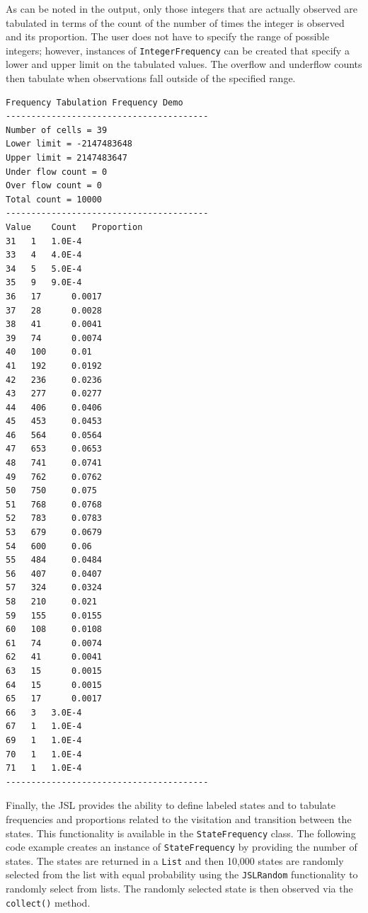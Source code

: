 \documentclass[
]{book}
\theoremstyle{definition}
\theoremstyle{definition}
\theoremstyle{definition}
\theoremstyle{definition}
\theoremstyle{remark}
\begin{document}
As can be noted in the output, only those integers that are actually observed are tabulated in terms of the count of the number of times the integer is observed and its proportion. The user does not have to specify the range of possible integers; however, instances of \texttt{IntegerFrequency} can be created that specify a lower and upper limit on the tabulated values. The overflow and underflow counts then tabulate when observations fall outside of the specified range.

\begin{verbatim}
Frequency Tabulation Frequency Demo
----------------------------------------
Number of cells = 39
Lower limit = -2147483648
Upper limit = 2147483647
Under flow count = 0
Over flow count = 0
Total count = 10000
----------------------------------------
Value    Count   Proportion
31   1   1.0E-4
33   4   4.0E-4
34   5   5.0E-4
35   9   9.0E-4
36   17      0.0017
37   28      0.0028
38   41      0.0041
39   74      0.0074
40   100     0.01
41   192     0.0192
42   236     0.0236
43   277     0.0277
44   406     0.0406
45   453     0.0453
46   564     0.0564
47   653     0.0653
48   741     0.0741
49   762     0.0762
50   750     0.075
51   768     0.0768
52   783     0.0783
53   679     0.0679
54   600     0.06
55   484     0.0484
56   407     0.0407
57   324     0.0324
58   210     0.021
59   155     0.0155
60   108     0.0108
61   74      0.0074
62   41      0.0041
63   15      0.0015
64   15      0.0015
65   17      0.0017
66   3   3.0E-4
67   1   1.0E-4
69   1   1.0E-4
70   1   1.0E-4
71   1   1.0E-4
----------------------------------------
\end{verbatim}

Finally, the JSL provides the ability to define labeled states and to tabulate frequencies and proportions related to the visitation and transition between the states. This functionality is available in the \texttt{StateFrequency} class. The following code example creates an instance of \texttt{StateFrequency} by providing the number of states. The states are returned in a \texttt{List} and then 10,000 states are randomly selected from the list with equal probability using the \texttt{JSLRandom} functionality to randomly select from lists. The randomly selected state is then observed via the \texttt{collect()} method.
\end{document}
